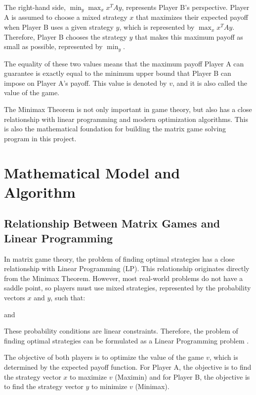 \documentclass[12pt,a4paper]{article}
\begin{document}
The right-hand side, \(\min_y \max_x x^T A y\), represents Player B's perspective. Player A is assumed to choose a mixed strategy \(x\) that maximizes their expected payoff when Player B uses a given strategy \(y\), which is represented by \(\max_x x^T A y\). Therefore, Player B chooses the strategy \(y\) that makes this maximum payoff as small as possible, represented by \(\min_y\).

The equality of these two values means that the maximum payoff Player A can guarantee is exactly equal to the minimum upper bound that Player B can impose on Player A's payoff. This value is denoted by \(v\), and it is also called the value of the game.

The Minimax Theorem is not only important in game theory, but also has a close relationship with linear programming and modern optimization algorithms. This is also the mathematical foundation for building the matrix game solving program in this project.



\section{Mathematical Model and Algorithm}
\subsection{Relationship Between Matrix Games and Linear Programming}
In matrix game theory, the problem of finding optimal strategies has a close relationship with Linear Programming (LP). This relationship originates directly from the Minimax Theorem. However, most real-world problems do not have a saddle point, so players must use mixed strategies, represented by the probability vectors \(x\) and \(y\), such that:

\noindent{}

and 

\noindent{}

These probability conditions are linear constraints. Therefore, the problem of finding optimal strategies can be formulated as a Linear Programming problem \cite{thie2008}.

The objective of both players is to optimize the value of the game \(v\), which is determined by the expected payoff function. For Player A, the objective is to find the strategy vector \(x\) to maximize \(v\) (Maximin) and for Player B, the objective is to find the strategy vector \(y\) to minimize \(v\) (Minimax).
\end{document}
